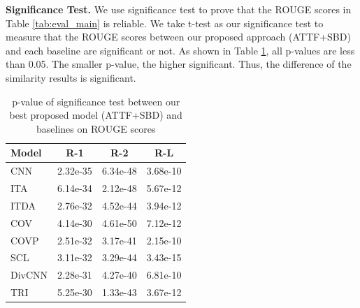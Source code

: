 \documentclass{nle}
\theoremstyle{definition}
\newcommand{\tabref}[1]{Table \ref{#1}}
\begin{document}
\textbf{Significance Test.} We use significance test to prove that the ROUGE scores in \tabref{tab:eval_main} is reliable.
We take t-test 
\citep{loukina2014automatic,albert2017exploring}
as our significance test to
measure that the ROUGE scores between our proposed approach (ATTF+SBD) and each baseline are significant or not. 
As shown in \tabref{tab:ttest},
all p-values are less than 0.05. 
The smaller p-value, the higher significant.
Thus, the difference of the similarity results is significant. 
\begin{table}[th!]
	\begin{center}
		\caption{p-value of significance test between 
			our best proposed model (ATTF+SBD) and baselines on ROUGE scores}
		\begin{tabular}{|l|c|c|c|}
			\hline
			Model &   R-1 & R-2 & R-L \\
			\hline
			CNN &  2.32e-35 & 6.34e-48 & 3.68e-10 \\
			ITA &  6.14e-34 & 2.12e-48 & 5.67e-12 \\
			ITDA & 2.76e-32 & 4.52e-44 & 3.94e-12 \\
			COV	& 4.14e-30 & 4.61e-50 & 7.12e-12 \\
			COVP & 2.51e-32 & 3.17e-41 & 2.15e-10 \\
			SCL	& 3.11e-32 & 3.29e-44 & 3.43e-15 \\
			DivCNN	& 2.28e-31 & 4.27e-40 & 6.81e-10 \\
			TRI & 5.25e-30 & 1.33e-43 & 3.67e-12 \\
			\hline
		\end{tabular}
		\label{tab:ttest}
	\end{center}
\end{table}
\end{document}
